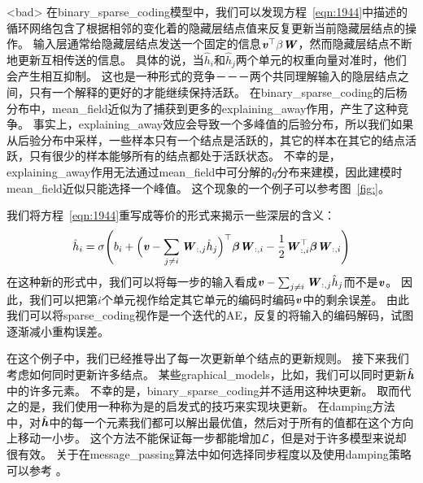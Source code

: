 <bad>
在\gls{binary_sparse_coding}模型中，我们可以发现方程~\eqref{eqn:1944}中描述的循环网络包含了根据相邻的变化着的隐藏层结点值来反复更新当前隐藏层结点的操作。
输入层通常给隐藏层结点发送一个固定的信息$\boldsymbol{\mathit{v}}^{\top}\beta\boldsymbol{\mathit{W}}$，然而隐藏层结点不断地更新互相传送的信息。
具体的说，当$\hat{h}_i$和$\hat{h}_j$两个单元的权重向量对准时，他们会产生相互抑制。
这也是一种形式的竞争－－－两个共同理解输入的隐层结点之间，只有一个解释的更好的才能继续保持活跃。
在\gls{binary_sparse_coding}的后杨分布中，\gls{mean_field}近似为了捕获到更多的\gls{explaining_away}作用，产生了这种竞争。
事实上，\gls{explaining_away}效应会导致一个多峰值的后验分布，所以我们如果从后验分布中采样，一些样本只有一个结点是活跃的，其它的样本在其它的结点活跃，只有很少的样本能够所有的结点都处于活跃状态。
不幸的是，\gls{explaining_away}作用无法通过\gls{mean_field}中可分解的$q$分布来建模，因此建模时\gls{mean_field}近似只能选择一个峰值。
这个现象的一个例子可以参考图~\ref{fig:}。




我们将方程~\eqref{eqn:1944}重写成等价的形式来揭示一些深层的含义：
\begin{align}
\hat{h}_i = \sigma\Bigg(b_i + \Big(\boldsymbol{\mathit{v}} - \sum_{j\neq i} \boldsymbol{\mathit{W}}_{:,j}\hat{h}_j\Big)^{\top} {\boldsymbol{\beta}}\boldsymbol{\mathit{W}}_{:,i} - \frac{1}{2} \boldsymbol{\mathit{W}}_{:,i}^{\top} {\boldsymbol{\beta}} \boldsymbol{\mathit{W}}_{:,i}\Bigg) 
\end{align}
在这种新的形式中，我们可以将每一步的输入看成$\boldsymbol{\mathit{v}} - \sum_{j\neq i} \boldsymbol{\mathit{W}}_{:,j}\hat{h}_j$而不是$\boldsymbol{\mathit{v}}$。
因此，我们可以把第$i$个单元视作给定其它单元的编码时编码$\boldsymbol{\mathit{v}}$中的剩余误差。
由此我们可以将\gls{sparse_coding}视作是一个迭代的\gls{AE}，反复的将输入的编码解码，试图逐渐减小重构误差。


在这个例子中，我们已经推导出了每一次更新单个结点的更新规则。
接下来我们考虑如何同时更新许多结点。
某些\gls{graphical_models}，比如，我们可以同时更新$\hat{\boldsymbol{\mathit{h}}}$中的许多元素。
不幸的是，\gls{binary_sparse_coding}并不适用这种块更新。
取而代之的是，我们使用一种称为是的启发式的技巧来实现块更新。
在\gls{damping}方法中，对$\hat{\boldsymbol{\mathit{h}}}$中的每一个元素我们都可以解出最优值，然后对于所有的值都在这个方向上移动一小步。
这个方法不能保证每一步都能增加$\mathcal{L}$，但是对于许多模型来说却很有效。
关于在\gls{message_passing}算法中如何选择同步程度以及使用\gls{damping}策略可以参考\citet{koller-book2009} 。




\subsection{}
\label{sec:calculus_of_variations}

